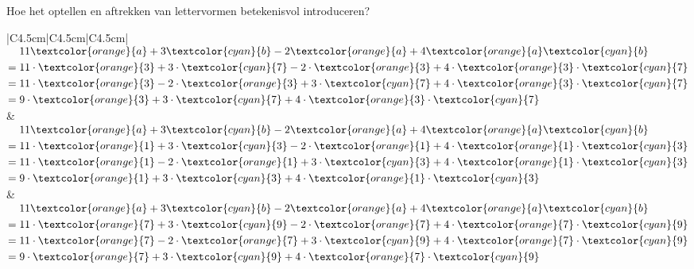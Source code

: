 \begin{lesactiviteit}{Hoe het optellen en aftrekken van lettervormen betekenisvol introduceren?}
\begin{tabel}
\begin{tabular}{|C{4.5cm}|C{4.5cm}|C{4.5cm}|}
    $
    \begin{aligned}
        &11\textcolor{orange}{a}+3\textcolor{cyan}{b}-2\textcolor{orange}{a}+4\textcolor{orange}{a}\textcolor{cyan}{b}\\
        =\;& 11\cdot \textcolor{orange}{3}+3\cdot \textcolor{cyan}{7} -2\cdot \textcolor{orange}{3}+4\cdot\textcolor{orange}{3}\cdot \textcolor{cyan}{7}\\
        =\;& 11\cdot \textcolor{orange}{3}-2\cdot \textcolor{orange}{3}+3\cdot \textcolor{cyan}{7} +4\cdot\textcolor{orange}{3}\cdot \textcolor{cyan}{7}\\
        =\;& 9\cdot \textcolor{orange}{3}+3\cdot \textcolor{cyan}{7} +4\cdot\textcolor{orange}{3}\cdot \textcolor{cyan}{7}\\
    \end{aligned}
    $
    &
    $
    \begin{aligned}
        &11\textcolor{orange}{a}+3\textcolor{cyan}{b}-2\textcolor{orange}{a}+4\textcolor{orange}{a}\textcolor{cyan}{b}\\
        =\;& 11\cdot \textcolor{orange}{1}+3\cdot \textcolor{cyan}{3} -2\cdot \textcolor{orange}{1}+4\cdot\textcolor{orange}{1}\cdot \textcolor{cyan}{3}\\
        =\;& 11\cdot \textcolor{orange}{1}-2\cdot \textcolor{orange}{1}+3\cdot \textcolor{cyan}{3} +4\cdot\textcolor{orange}{1}\cdot \textcolor{cyan}{3}\\
        =\;& 9\cdot \textcolor{orange}{1}+3\cdot \textcolor{cyan}{3} +4\cdot\textcolor{orange}{1}\cdot \textcolor{cyan}{3}\\
    \end{aligned}
    $
    &
    $
    \begin{aligned}
        &11\textcolor{orange}{a}+3\textcolor{cyan}{b}-2\textcolor{orange}{a}+4\textcolor{orange}{a}\textcolor{cyan}{b}\\
        =\;& 11\cdot \textcolor{orange}{7}+3\cdot \textcolor{cyan}{9} -2\cdot \textcolor{orange}{7}+4\cdot\textcolor{orange}{7}\cdot \textcolor{cyan}{9}\\
        =\;& 11\cdot \textcolor{orange}{7}-2\cdot \textcolor{orange}{7}+3\cdot \textcolor{cyan}{9} +4\cdot\textcolor{orange}{7}\cdot \textcolor{cyan}{9}\\
        =\;& 9\cdot \textcolor{orange}{7}+3\cdot \textcolor{cyan}{9} +4\cdot\textcolor{orange}{7}\cdot \textcolor{cyan}{9}\\
    \end{aligned}
    $
    \\
    \hlinethick

\end{tabular}
\end{tabel}
\end{lesactiviteit}
